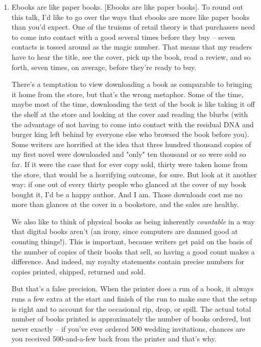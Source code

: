 \begin{enumerate}
\item
  Ebooks are like paper books. [Ebooks are like paper books]. To
  round out this talk, I'd like to go over the ways that ebooks are
  more like paper books than you'd expect. One of the truisms of
  retail theory is that purchasers need to come into contact with a
  good several times before they buy -- seven contacts is tossed
  around as the magic number. That means that my readers have to hear
  the title, see the cover, pick up the book, read a review, and so
  forth, seven times, on average, before they're ready to buy.

  There's a temptation to view downloading a book as comparable to
  bringing it home from the store, but that's the wrong metaphor.
  Some of the time, maybe most of the time, downloading the text of
  the book is like taking it off the shelf at the store and looking
  at the cover and reading the blurbs (with the advantage of not
  having to come into contact with the residual DNA and burger king
  left behind by everyone else who browsed the book before you). Some
  writers are horrified at the idea that three hundred thousand
  copies of my first novel were downloaded and "only" ten thousand or
  so were sold so far. If it were the case that for ever copy sold,
  thirty were taken home from the store, that would be a horrifying
  outcome, for sure. But look at it another way: if one out of every
  thirty people who glanced at the cover of my book bought it, I'd be
  a happy author. And I am. Those downloads cost me no more than
  glances at the cover in a bookstore, and the sales are healthy.
  
  We also like to think of physical books as being inherently
  \emph{countable} in a way that digital books aren't (an irony,
  since computers are damned good at counting things!). This is
  important, because writers get paid on the basis of the number of
  copies of their books that sell, so having a good count makes a
  difference. And indeed, my royalty statements contain precise
  numbers for copies printed, shipped, returned and sold.
  
  But that's a false precision. When the printer does a run of a
  book, it always runs a few extra at the start and finish of the run
  to make sure that the setup is right and to account for the
  occasional rip, drop, or spill. The actual total number of books
  printed is approximately the number of books ordered, but never
  exactly -- if you've ever ordered 500 wedding invitations, chances
  are you received 500-and-a-few back from the printer and that's
  why.
  

\end{enumerate}
